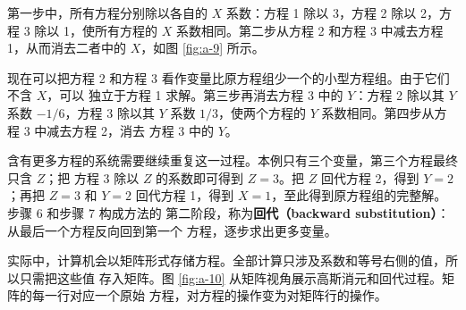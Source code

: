 第一步中，所有方程分别除以各自的 $X$ 系数：方程 1 除以 3，方程 2 除以 2，方程 3 除以
1，使所有方程的 $X$ 系数相同。第二步从方程 2 和方程 3 中减去方程 1，从而消去二者中的
$X$，如图 \ref{fig:a-9} 所示。

现在可以把方程 2 和方程 3 看作变量比原方程组少一个的小型方程组。由于它们不含 $X$，可以
独立于方程 1 求解。第三步再消去方程 3 中的 $Y$：方程 2 除以其 $Y$ 系数 $-1/6$，方程 3
除以其 $Y$ 系数 $1/3$，使两个方程的 $Y$ 系数相同。第四步从方程 3 中减去方程 2，消去
方程 3 中的 $Y$。

含有更多方程的系统需要继续重复这一过程。本例只有三个变量，第三个方程最终只含 $Z$；把
方程 3 除以 $Z$ 的系数即可得到 $Z=3$。把 $Z$ 回代方程 2，得到 $Y=2$；再把 $Z=3$ 和
$Y=2$ 回代方程 1，得到 $X=1$，至此得到原方程组的完整解。步骤 6 和步骤 7 构成方法的
第二阶段，称为\textbf{回代（backward substitution）}：从最后一个方程反向回到第一个
方程，逐步求出更多变量。

实际中，计算机会以矩阵形式存储方程。全部计算只涉及系数和等号右侧的值，所以只需把这些值
存入矩阵。图 \ref{fig:a-10} 从矩阵视角展示高斯消元和回代过程。矩阵的每一行对应一个原始
方程，对方程的操作变为对矩阵行的操作。

